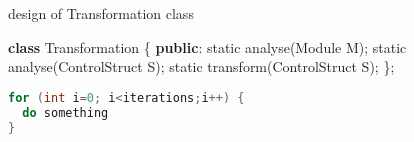 \documentclass{article}
\begin{document}
\begin{algorithm}
  \caption{design of Transformation class}
  \begin{algorithmic}[1]
    \State \textbf{class} Transformation \{
    \State \textbf{public}:
    \State static analyse(Module M);
    \State
    \State static analyse(ControlStruct S);
    \State
    \State static transform(ControlStruct S);
    \State \};
  \end{algorithmic}
\end{algorithm}

\begin{lstlisting}[language=C++]
for (int i=0; i<iterations;i++) {
  do something
}
\end{lstlisting}
\end{document}
